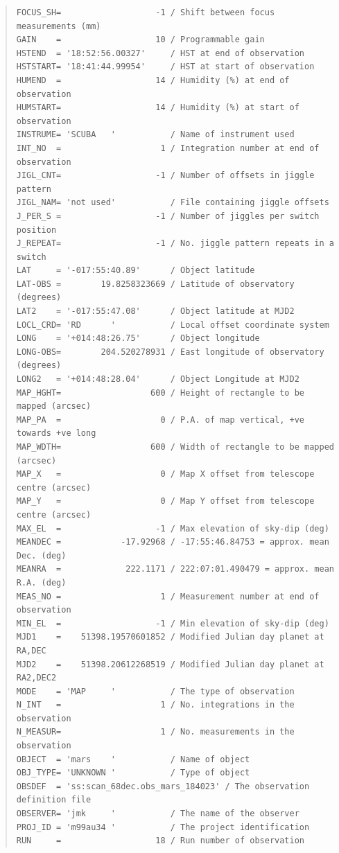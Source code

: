 \documentclass[twoside,11pt]{article}
\newenvironment{myquote}{\begin{quote}\begin{small}}{\end{small}\end{quote}}
\renewcommand{\_}{\texttt{\symbol{95}}}
\begin{document}
\begin{myquote}
\begin{verbatim}
FOCUS_SH=                   -1 / Shift between focus measurements (mm)
GAIN    =                   10 / Programmable gain
HSTEND  = '18:52:56.00327'     / HST at end of observation
HSTSTART= '18:41:44.99954'     / HST at start of observation
HUMEND  =                   14 / Humidity (%) at end of observation
HUMSTART=                   14 / Humidity (%) at start of observation
INSTRUME= 'SCUBA   '           / Name of instrument used
INT_NO  =                    1 / Integration number at end of observation
JIGL_CNT=                   -1 / Number of offsets in jiggle pattern
JIGL_NAM= 'not used'           / File containing jiggle offsets
J_PER_S =                   -1 / Number of jiggles per switch position
J_REPEAT=                   -1 / No. jiggle pattern repeats in a switch
LAT     = '-017:55:40.89'      / Object latitude
LAT-OBS =        19.8258323669 / Latitude of observatory (degrees)
LAT2    = '-017:55:47.08'      / Object latitude at MJD2
LOCL_CRD= 'RD      '           / Local offset coordinate system
LONG    = '+014:48:26.75'      / Object longitude
LONG-OBS=        204.520278931 / East longitude of observatory (degrees)
LONG2   = '+014:48:28.04'      / Object Longitude at MJD2
MAP_HGHT=                  600 / Height of rectangle to be mapped (arcsec)
MAP_PA  =                    0 / P.A. of map vertical, +ve towards +ve long
MAP_WDTH=                  600 / Width of rectangle to be mapped (arcsec)
MAP_X   =                    0 / Map X offset from telescope centre (arcsec)
MAP_Y   =                    0 / Map Y offset from telescope centre (arcsec)
MAX_EL  =                   -1 / Max elevation of sky-dip (deg)
MEANDEC =            -17.92968 / -17:55:46.84753 = approx. mean Dec. (deg)
MEANRA  =             222.1171 / 222:07:01.490479 = approx. mean R.A. (deg)
MEAS_NO =                    1 / Measurement number at end of observation
MIN_EL  =                   -1 / Min elevation of sky-dip (deg)
MJD1    =    51398.19570601852 / Modified Julian day planet at RA,DEC
MJD2    =    51398.20612268519 / Modified Julian day planet at RA2,DEC2
MODE    = 'MAP     '           / The type of observation
N_INT   =                    1 / No. integrations in the observation
N_MEASUR=                    1 / No. measurements in the observation
OBJECT  = 'mars    '           / Name of object
OBJ_TYPE= 'UNKNOWN '           / Type of object
OBSDEF  = 'ss:scan_68dec.obs_mars_184023' / The observation definition file
OBSERVER= 'jmk     '           / The name of the observer
PROJ_ID = 'm99au34 '           / The project identification
RUN     =                   18 / Run number of observation

\end{verbatim}
\end{myquote}
\end{document}
